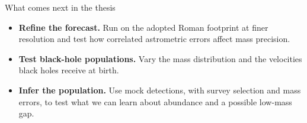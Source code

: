 \begin{frame}{What comes next in the thesis}
\begin{itemize}\setlength{\itemsep}{9pt}
  \item<+-> \textbf{Refine the forecast.} Run on the adopted Roman footprint at finer resolution
        and test how correlated astrometric errors affect mass precision.
  \item<+-> \textbf{Test black-hole populations.} Vary the mass distribution and the velocities
        black holes receive at birth.
  \item<+-> \textbf{Infer the population.} Use mock detections, with survey selection and mass
        errors, to test what we can learn about abundance and a possible low-mass gap.
\end{itemize}
\end{frame}
